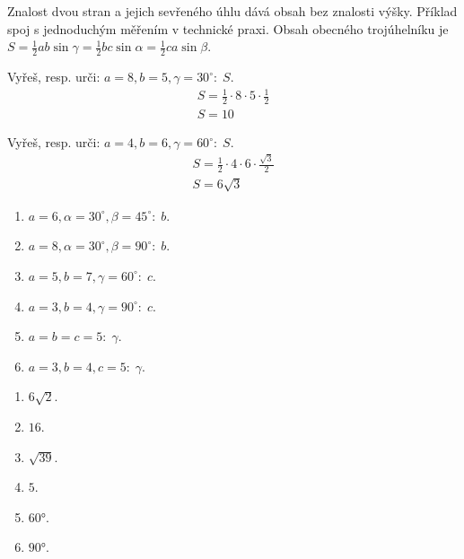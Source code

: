 \documentclass[11pt,a4paper]{article}
\begin{document}
Znalost dvou stran a jejich sevřeného úhlu dává obsah bez znalosti výšky. Příklad spoj s jednoduchým měřením v technické praxi.
Obsah obecného trojúhelníku je $S=\frac{1}{2}ab\sin\gamma=\frac{1}{2}bc\sin\alpha=\frac{1}{2}ca\sin\beta$.
\begin{prikladReseniBox}[title={Příklad 1}]
Vyřeš, resp. urči: $a=8,b=5,\gamma=30^\circ:\;S$.
\tcblower
\[\begin{aligned}S=\frac{1}{2}\cdot8\cdot5\cdot\frac{1}{2} \\ S=10\end{aligned}\]
\end{prikladReseniBox}
\begin{prikladReseniBox}[title={Příklad 2}]
Vyřeš, resp. urči: $a=4,b=6,\gamma=60^\circ:\;S$.
\tcblower
\[\begin{aligned}S=\frac{1}{2}\cdot4\cdot6\cdot\frac{\sqrt3}{2} \\ S=6\sqrt3\end{aligned}\]
\end{prikladReseniBox}
\begin{zadaniReseniBox}[title={Samostatná práce 1}]
\begin{enumerate}[label=\alph*)]
\item $a=6,\alpha=30^\circ,\beta=45^\circ:\;b$.
\item $a=8,\alpha=30^\circ,\beta=90^\circ:\;b$.
\item $a=5,b=7,\gamma=60^\circ:\;c$.
\item $a=3,b=4,\gamma=90^\circ:\;c$.
\item $a=b=c=5:\;\gamma$.
\item $a=3,b=4,c=5:\;\gamma$.
\end{enumerate}
\tcblower
\begin{enumerate}[label=\alph*)]
\item $6\sqrt2$.
\item $16$.
\item $\sqrt{39}$.
\item $5$.
\item $60°$.
\item $90°$.
\end{enumerate}
\end{zadaniReseniBox}
\end{document}

